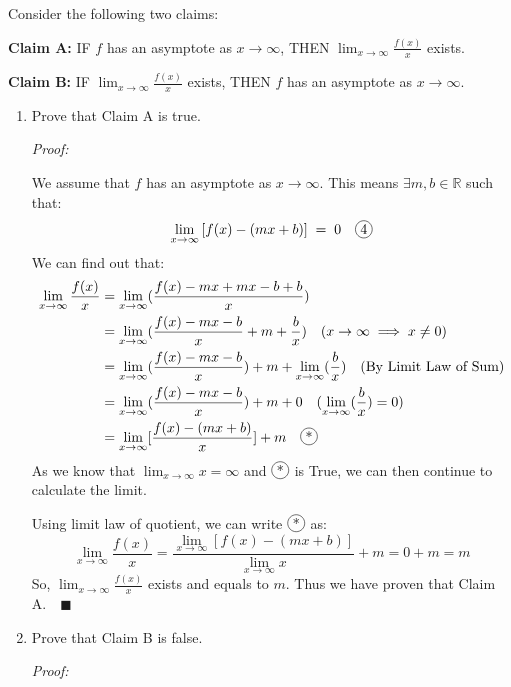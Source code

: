 \documentclass[12pt]{exam}
\newcommand*\circled[1]{\tikz[baseline=(char.base)]{
    \node[shape=circle, draw, inner sep=1pt, 
        minimum height=12pt] (char) {#1};}}
\newcommand {\DS} [1] {${\displaystyle #1}$}
\newcommand{\vv}{\vspace{.1cm}}
\newcommand{\R}{\mathbb{R}}
\begin{document}
\begin{enumerate}
Consider the following two claims:	
			\begin{center}
				{\bf Claim A:} \quad \quad
					IF $f$ has an asymptote as $x \to \infty$,  \quad
					THEN \DS{\lim_{x \to \infty} \frac{f(x)}{x}} exists.
				
				{\bf Claim B:} \quad \quad 		
					IF \DS{\lim_{x \to \infty} \frac{f(x)}{x}} exists, \quad
					THEN $f$ has an asymptote as $x \to \infty$.
			\end{center}
	\begin{enumerate}
		\item Prove that Claim A is true.
		
		\vv
		
		\emph{Proof:}
		
		\vv
		
		We assume that $f$ has an asymptote as $x \to \infty$. This means $\exists m,b\in\R$ such that:
		$$
		    \lim_{x \to \infty} \left[ f(x) - \left( mx + b \right) \right] \; = \; 0 \quad\circled{4}
		$$
		We can find out that:
		\begin{align*}
		    \lim_{x \to \infty} \frac{f(x)}{x}
		    &=\lim_{x \to \infty} (\frac{f(x)-mx+mx-b+b}{x})\\
		    &=\lim_{x \to \infty} (\frac{f(x)-mx-b}{x}+m+\frac{b}{x}) \quad (x \to \infty \implies x \neq 0)\\
		    &=\lim_{x \to \infty}(\frac{f(x)-mx-b}{x})+m+\lim_{x \to \infty}(\frac{b}{x}) \quad(\mbox{By Limit Law of Sum})\\
		    &=\lim_{x \to \infty}(\frac{f(x)-mx-b}{x})+m+0\quad(\lim_{x \to \infty}(\frac{b}{x})=0)\\
		    &=\lim_{x \to \infty}[\frac{f(x)-(mx+b)}{x}]+m \quad \circled{*}
		\end{align*}
		As we know that $\lim_{x \to \infty}x=\infty$ and $\circled{*}$ is True, we can then continue to calculate the limit. 
		
		Using limit law of quotient, we can write $\circled{*}$ as:
		$$
		    \lim_{x \to \infty} \frac{f(x)}{x}=\frac{\lim_{x \to \infty}[f(x)-(mx+b)]}{\lim_{x \to \infty}x}+m=0+m=m
		$$
		So, $\lim_{x \to \infty} \frac{f(x)}{x}$ exists and equals to $m$. Thus we have proven that Claim A.$\quad\blacksquare$
		
		\newpage
		
		\item Prove that Claim B is false.
		
		\vv
		
		\emph{Proof:}
		

\end{enumerate}
\end{enumerate}
\end{document}
